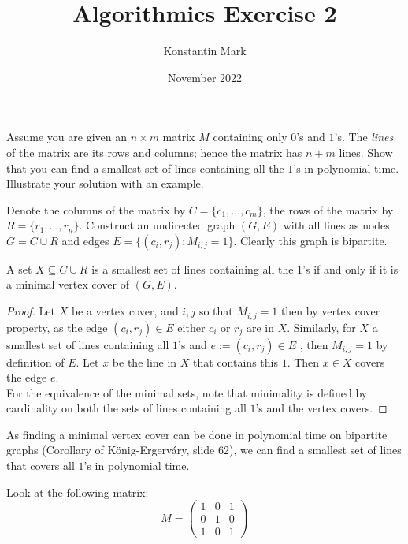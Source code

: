 \documentclass{article}
\title{Algorithmics Exercise 2}
\author{Konstantin Mark}
\date{November 2022}
\begin{document}
\maketitle


\listoftheorems[ignoreall,show={exercise}]

\newpage

\begin{exercise}
    Assume you are given an $n\times m$ matrix $M$ containing only $0$'s and $1$'s. The \textit{lines} of the matrix are its rows and columns; hence the matrix has $n+m$ lines. Show that you can find a smallest set of lines containing all the $1$'s in polynomial time. Illustrate your solution with an example.
\end{exercise}
\begin{solving}
    Denote the columns of the matrix by $C = \{c_1,\dots, c_m\}$, the rows of the matrix by $R = \{r_1,\dots ,r_n\}$. Construct an undirected graph $(G, E)$ with all lines as nodes $G = C\cup R$ and edges $E = \{ (c_i, r_j) : M_{i,j} = 1\}$. Clearly this graph is bipartite. 
    \begin{proposition}
        A set $X\subseteq C\cup R$ is a smallest set of lines containing all the $1$'s if and only if it is a minimal vertex cover of $(G, E)$.
    \end{proposition}
    \begin{proof}
        Let $X$ be a vertex cover, and $i, j$ so that $M_{i,j} = 1$ then by vertex cover property, as the edge $(c_i, r_j)\in E$ either $c_i$ or $r_j$ are in $X$. Similarly, for $X$ a smallest set of lines containing all $1$'s and $e:= (c_i, r_j)\in E$ , then $M_{i,j} = 1$ by definition of $E$. Let $x$ be the line in $X$ that contains this $1$. Then $x\in X$ covers the edge  $e$.\\
        For the equivalence of the minimal sets, note that minimality is defined by cardinality on both the sets of lines containing all $1$'s and the vertex covers.
    \end{proof}
    As finding a minimal vertex cover can be done in polynomial time on bipartite graphs (Corollary of König-Ergerváry, slide 62), we can find a smallest set of lines that covers all $1$'s in polynomial time.

    \begin{example}
        Look at the following matrix: \begin{equation*}
            M = \left(\begin{array}{ccc}
                 1&0&1  \\
                 0&1&0 \\
                 1&0&1
            \end{array}\right)
        \end{equation*}


\end{example}
\end{solving}
\end{document}
